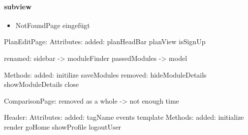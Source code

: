 \paragraph{subview}
\begin{itemize}
	\item NotFoundPage eingefügt
\end{itemize}
PlanEditPage:
	Attributes:
		added:
			planHeadBar
			planView
			isSignUp
	
		renamed: 
			sidebar -> moduleFinder
			passedModules -> model
	
	
	Methods:
		added:
			initilize
			saveModules
		removed:
			hideModuleDetails
			showModuleDetails
			close

ComparisonPage:
	removed as a whole -> not enough time
	
Header:
	Attributes:
		added:
			tagName
			events
			template
	Methods:
		added:
			initialize
			render
			goHome
			showProfile
			logoutUser


